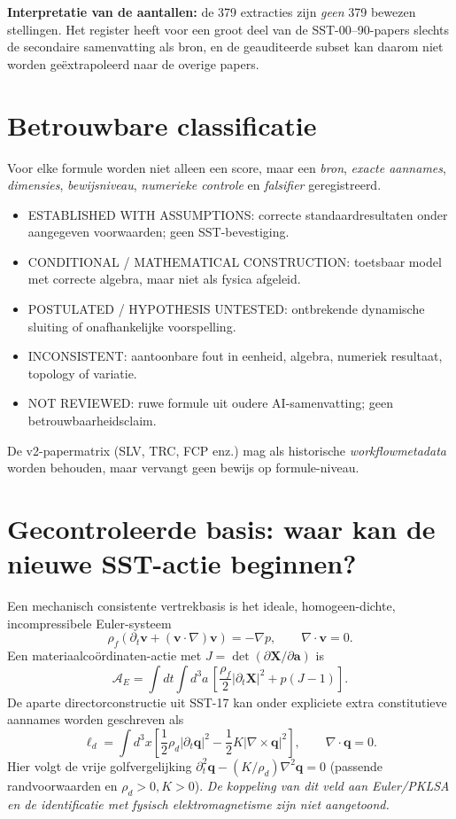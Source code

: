 \documentclass[10pt,a4paper]{article}
\newcommand{\rhof}{\rho_{\!f}}
\newcommand{\status}[1]{\textsf{#1}}
\begin{document}
\textbf{Interpretatie van de aantallen:} de 379 extracties zijn \emph{geen} 379 bewezen stellingen. Het register heeft voor een groot deel van de SST-00--90-papers slechts de secondaire samenvatting als bron, en de geauditeerde subset kan daarom niet worden geëxtrapoleerd naar de overige papers.

\section{Betrouwbare classificatie}
Voor elke formule worden niet alleen een score, maar een \emph{bron}, \emph{exacte aannames}, \emph{dimensies}, \emph{bewijsniveau}, \emph{numerieke controle} en \emph{falsifier} geregistreerd.
\begin{itemize}\setlength\itemsep{1pt}
\item \status{ESTABLISHED WITH ASSUMPTIONS}: correcte standaardresultaten onder aangegeven voorwaarden; geen SST-bevestiging.
\item \status{CONDITIONAL / MATHEMATICAL CONSTRUCTION}: toetsbaar model met correcte algebra, maar niet als fysica afgeleid.
\item \status{POSTULATED / HYPOTHESIS UNTESTED}: ontbrekende dynamische sluiting of onafhankelijke voorspelling.
\item \status{INCONSISTENT}: aantoonbare fout in eenheid, algebra, numeriek resultaat, topology of variatie.
\item \status{NOT REVIEWED}: ruwe formule uit oudere AI-samenvatting; geen betrouwbaarheidsclaim.
\end{itemize}
De v2-papermatrix (SLV, TRC, FCP enz.) mag als historische \emph{workflowmetadata} worden behouden, maar vervangt geen bewijs op formule-niveau.

\section{Gecontroleerde basis: waar kan de nieuwe SST-actie beginnen?}
Een mechanisch consistente vertrekbasis is het ideale, homogeen-dichte, incompressibele Euler-systeem
\begin{equation}
\rhof(\partial_t\mathbf v+(\mathbf v\cdot\nabla)\mathbf v)=-\nabla p,\qquad \nabla\cdot\mathbf v=0.
\end{equation}
Een materiaalco\"ordinaten-actie met \(J=\det(\partial \mathbf X/\partial\mathbf a)\) is
\begin{equation}
\mathcal A_E=\int dt\int d^3a\,\left[\frac{\rhof}{2}|\partial_t\mathbf X|^2+p(J-1)\right].
\end{equation}
De aparte directorconstructie uit SST-17 kan onder expliciete extra constitutieve aannames worden geschreven als
\begin{equation}
\ell_d=\int d^3x\left[\frac12\rho_d|\partial_t\mathbf q|^2-\frac12 K|\nabla\times\mathbf q|^2\right],\qquad \nabla\cdot\mathbf q=0.
\end{equation}
Hier volgt de vrije golfvergelijking \(\partial_t^2\mathbf q-(K/\rho_d)\nabla^2\mathbf q=0\) (passende randvoorwaarden en \(\rho_d>0,K>0\)). \emph{De koppeling van dit veld aan Euler/PKLSA en de identificatie met fysisch elektromagnetisme zijn niet aangetoond.}
\end{document}
